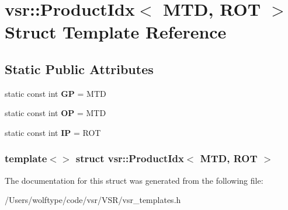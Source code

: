 \hypertarget{structvsr_1_1_product_idx_3_01_m_t_d_00_01_r_o_t_01_4}{\section{vsr\-:\-:Product\-Idx$<$ M\-T\-D, R\-O\-T $>$ Struct Template Reference}
\label{structvsr_1_1_product_idx_3_01_m_t_d_00_01_r_o_t_01_4}
}
\subsection*{Static Public Attributes}
\begin{DoxyCompactItemize}
\item 
\hypertarget{structvsr_1_1_product_idx_3_01_m_t_d_00_01_r_o_t_01_4_a236487bc35b4b2cc887b7bdc4fce7517}{static const int {\bfseries G\-P} = M\-T\-D}\label{structvsr_1_1_product_idx_3_01_m_t_d_00_01_r_o_t_01_4_a236487bc35b4b2cc887b7bdc4fce7517}

\item 
\hypertarget{structvsr_1_1_product_idx_3_01_m_t_d_00_01_r_o_t_01_4_a6a4b981f8c6832b9d0df536d50502fb7}{static const int {\bfseries O\-P} = M\-T\-D}\label{structvsr_1_1_product_idx_3_01_m_t_d_00_01_r_o_t_01_4_a6a4b981f8c6832b9d0df536d50502fb7}

\item 
\hypertarget{structvsr_1_1_product_idx_3_01_m_t_d_00_01_r_o_t_01_4_a3fa6d072081cbdaccdcddaf2e3ffeb25}{static const int {\bfseries I\-P} = R\-O\-T}\label{structvsr_1_1_product_idx_3_01_m_t_d_00_01_r_o_t_01_4_a3fa6d072081cbdaccdcddaf2e3ffeb25}

\end{DoxyCompactItemize}
\subsubsection*{template$<$$>$ struct vsr\-::\-Product\-Idx$<$ M\-T\-D, R\-O\-T $>$}



The documentation for this struct was generated from the following file\-:\begin{DoxyCompactItemize}
\item 
/\-Users/wolftype/code/vsr/\-V\-S\-R/vsr\-\_\-templates.\-h\end{DoxyCompactItemize}
